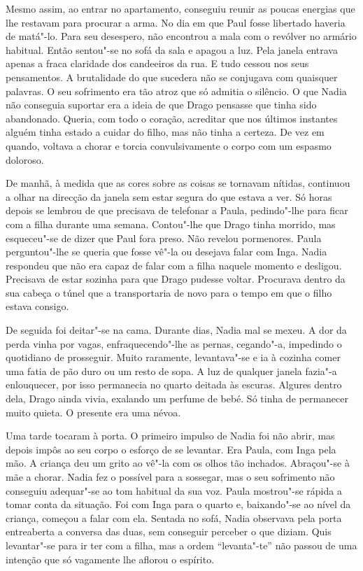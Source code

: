 Mesmo assim, ao entrar no apartamento, conseguiu
reunir as poucas energias que lhe restavam para procurar a arma. No dia
em que Paul fosse libertado haveria de matá"-lo. Para seu desespero, não
encontrou a mala com o
revólver no armário habitual. Então sentou"-se no sofá da sala e apagou a
luz. Pela janela entrava apenas a fraca claridade dos candeeiros da rua.
E tudo cessou nos seus pensamentos. A brutalidade do que sucedera não se
conjugava com quaisquer palavras. O seu sofrimento era tão atroz que
só admitia o silêncio. O que Nadia não conseguia suportar era a ideia
de que Drago pensasse que tinha sido abandonado. Queria, com todo o
coração, acreditar que nos últimos instantes alguém tinha estado a
cuidar do filho, mas não tinha a certeza. De vez em quando, voltava a
chorar e torcia convulsivamente o corpo com um espasmo doloroso.

De manhã, à medida que as cores sobre as coisas se tornavam nítidas,
continuou a olhar na direcção da janela sem estar segura do que estava a
ver. Só horas depois se lembrou de que precisava de telefonar a Paula,
pedindo"-lhe para ficar com a filha durante uma semana. Contou"-lhe que
Drago tinha morrido, mas esqueceu"-se de dizer que Paul fora preso. Não
revelou pormenores. Paula perguntou"-lhe se queria que fosse vê"-la ou desejava falar com Inga. Nadia
respondeu que não era capaz de falar com a filha naquele momento e
desligou. Precisava de estar sozinha para que Drago pudesse voltar.
Procurava dentro da sua cabeça o túnel que a transportaria de novo para
o tempo em que o filho estava consigo.

De seguida foi deitar"-se na cama. Durante dias, Nadia mal se mexeu. A
dor da perda vinha por vagas, enfraquecendo"-lhe as pernas, cegando"-a,
impedindo o quotidiano de prosseguir. Muito raramente, levantava"-se e
ia à cozinha comer uma fatia de pão duro ou um resto de sopa.
A luz de qualquer janela fazia"-a enlouquecer, por isso permanecia no
quarto deitada às escuras. Algures dentro dela, Drago ainda vivia,
exalando um perfume de bebé. Só tinha de permanecer muito quieta. O
presente era uma névoa.

Uma tarde tocaram à porta. O primeiro impulso de Nadia foi não abrir,
mas depois impôs ao seu corpo o esforço de se levantar. Era Paula, com
Inga pela mão. A criança deu um grito ao vê"-la com os olhos tão
inchados. Abraçou"-se à mãe a chorar. Nadia fez o possível para a
sossegar, mas o seu sofrimento não conseguiu adequar"-se ao tom habitual
da sua voz. Paula mostrou"-se rápida a tomar conta da situação. Foi com
Inga para o quarto e, baixando"-se ao nível da criança, começou a falar com ela. Sentada no sofá, Nadia
observava pela porta entreaberta a conversa das duas, sem conseguir
perceber o que diziam. Quis levantar"-se para ir ter com a filha, mas a
ordem ``levanta"-te'' não passou de uma intenção que só vagamente lhe
aflorou o espírito.

